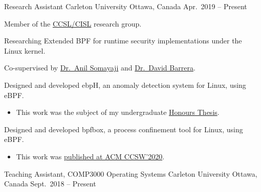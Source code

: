 

\begin{cventries}

  \cventry
    {Research Assistant} %
    {Carleton University} %
    {Ottawa, Canada} %
    {Apr.~2019 -- Present} %
    {
      \begin{cvitems} %
        \item Member of the \href{https://www.cisl.carleton.ca/}{CCSL/CISL} research group.
        \item Researching Extended BPF for runtime security implementations under the Linux kernel.
        \item Co-supervised by \href{https://people.scs.carleton.ca/~soma/}{Dr.~Anil Somayaji}
          and \href{https://dbarrera.xyz/}{Dr.~David Barrera}.
        \item Designed and developed ebpH, an anomaly detection system for Linux, using eBPF.
        \begin{itemize}
          \item This work was the subject of my undergraduate
            \href{https://www.cisl.carleton.ca/~will/written/coursework/undergrad-ebpH-thesis.pdf}
              {Honours Thesis}.
        \end{itemize}
        \item Designed and developed bpfbox, a process confinement tool for Linux, using eBPF.
        \begin{itemize}
          \item This work was \href{https://dl.acm.org/doi/10.1145/3411495.3421358}{published at ACM CCSW'2020}.
        \end{itemize}
      \end{cvitems}
    }
  \cventry
    {Teaching Assistant, COMP3000 Operating Systems} %
    {Carleton University} %
    {Ottawa, Canada} %
    {Sept.~2018 -- Present} %
    {
      \begin{cvitems} %

\end{cvitems}}
\end{cventries}
